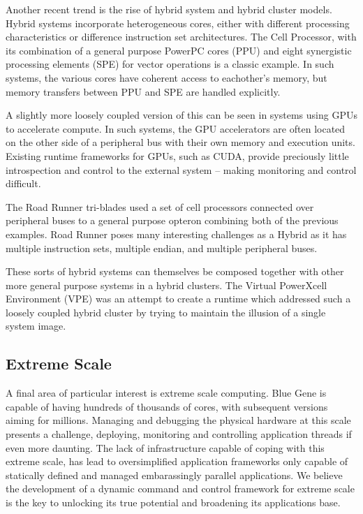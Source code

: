 \documentclass{sig-alternate}
\begin{document}
Another recent trend is the rise of hybrid system and hybrid cluster
models.  Hybrid systems incorporate heterogeneous cores, either with
different processing characteristics or difference instruction set
architectures.  The Cell Processor, with its combination of a general
purpose PowerPC cores (PPU) and eight synergistic processing elements (SPE)
for vector operations is a classic example.  In such systems, the various
cores have coherent access to eachother's memory, but memory transfers
between PPU and SPE are handled explicitly.

A slightly more loosely coupled version of this can be seen in systems
using GPUs to accelerate compute.  In such systems, the GPU accelerators
are often located on the other side of a peripheral bus with their own
memory and execution units.  Existing runtime frameworks for GPUs, 
such as CUDA, provide preciously little introspection and control to the
external system -- making monitoring and control difficult.

The Road Runner tri-blades used a set of cell processors connected over
peripheral buses to a general purpose opteron combining both of the 
previous examples.  Road Runner poses many interesting challenges as
a Hybrid as it has multiple instruction sets, multiple endian, and multiple
peripheral buses.

These sorts of hybrid systems can themselves be composed together with
other more general purpose systems in a hybrid clusters.  The Virtual
PowerXcell Environment (VPE) was an attempt to create a runtime which
addressed such a loosely coupled hybrid cluster by trying to maintain
the illusion of a single system image.

\subsection*{Extreme Scale}

A final area of particular interest is extreme scale computing.
Blue Gene is capable of having hundreds of thousands of cores, with
subsequent versions aiming for millions.  Managing and debugging the
physical hardware at this scale presents a challenge, deploying, monitoring
and controlling application threads if even more daunting.
The lack of infrastructure capable of coping with this extreme scale,
has lead to oversimplified application frameworks only capable of statically
defined and managed embarassingly parallel applications.  We believe 
the development of a dynamic command and control framework for extreme
scale is the key to unlocking its true potential and broadening its
applications base.
\end{document}
